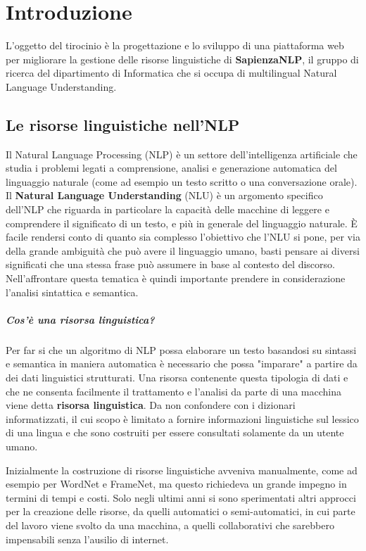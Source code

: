 
\chapter{Introduzione}

L'oggetto del tirocinio è la progettazione e lo sviluppo di una piattaforma web
per migliorare la gestione delle risorse linguistiche di \textbf{SapienzaNLP},
il gruppo di ricerca del dipartimento di Informatica che si occupa di multilingual
Natural Language Understanding.

\section{Le risorse linguistiche nell'NLP}
Il Natural Language Processing (NLP) è un settore dell'intelligenza artificiale
che studia i problemi legati a comprensione, analisi e generazione automatica del
linguaggio naturale (come ad esempio un testo scritto o una conversazione orale).
Il \textbf{Natural Language Understanding} (NLU) \cite{navigli2018natural} è un argomento
specifico dell'NLP che riguarda in particolare la capacità delle macchine di leggere
e comprendere il significato di un testo, e più in generale del linguaggio naturale.
È facile rendersi conto di quanto sia complesso l'obiettivo che l'NLU si pone,
per via della grande ambiguità che può avere il linguaggio umano, basti pensare
ai diversi significati che una stessa frase può assumere in base al contesto del
discorso.
Nell'affrontare questa tematica è quindi importante prendere in considerazione
l'analisi sintattica e semantica.

\paragraph{Cos'è una risorsa linguistica?}
Per far si che un algoritmo di NLP possa elaborare un testo basandosi su sintassi
e semantica in maniera automatica è necessario che possa "imparare" a partire
da dei dati linguistici strutturati.
Una risorsa contenente questa tipologia di dati e che ne consenta facilmente il
trattamento e l'analisi da parte di una macchina viene detta \textbf{risorsa linguistica}.
Da non confondere con i dizionari informatizzati, il cui scopo è limitato a
fornire informazioni linguistiche sul lessico di una lingua e che sono costruiti
per essere consultati solamente da un utente umano.

Inizialmente la costruzione di risorse linguistiche avveniva manualmente, come
ad esempio per WordNet e FrameNet, ma questo richiedeva un grande impegno in
termini di tempi e costi.
Solo negli ultimi anni si sono sperimentati altri approcci per la creazione
delle risorse, da quelli automatici o semi-automatici, in cui parte del lavoro
viene svolto da una macchina, a quelli collaborativi che sarebbero impensabili
senza l'ausilio di internet.

